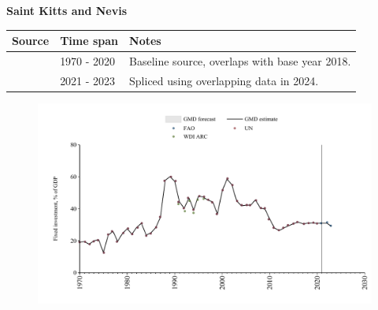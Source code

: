 \documentclass[12pt,a4paper,landscape]{article}
\begin{document}
\begin{adjustbox}{max totalsize={\paperwidth}{\paperheight},center}
\begin{minipage}[t][\textheight][t]{\textwidth}
\vspace*{0.5cm}
{}
\begin{center}
{\Large\bfseries Saint Kitts and Nevis}
\end{center}
\vspace{0.5cm}
\begin{table}[H]
\centering
\small
\begin{tabular}{|l|l|l|}
\hline
\textbf{Source} & \textbf{Time span} & \textbf{Notes} \\
\hline
\rowcolor{white}\cite{UN}& 1970 - 2020 &Baseline source, overlaps with base year 2018.\\
\rowcolor{lightgray}\cite{FAO}& 2021 - 2023 &Spliced using overlapping data in 2024.\\
\hline
\end{tabular}
\end{table}
\begin{figure}[H]
\centering
\includegraphics[width=\textwidth,height=0.6\textheight,keepaspectratio]{graphs/KNA_finv_GDP.pdf}
\end{figure}
\end{minipage}
\end{adjustbox}
\end{document}
